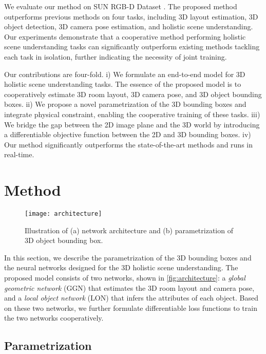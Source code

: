 \documentclass{article}
\begin{document}
We evaluate our method on SUN RGB-D Dataset \citep{song2015sun}. The proposed method outperforms previous methods on four tasks, including 3D layout estimation, 3D object detection, 3D camera pose estimation, and holistic scene understanding. Our experiments demonstrate that a cooperative method performing holistic scene understanding tasks can significantly outperform existing methods tackling each task in isolation, further indicating the necessity of joint training.

Our contributions are four-fold. i) We formulate an end-to-end model for 3D holistic scene understanding tasks. The essence of the proposed model is to cooperatively estimate 3D room layout, 3D camera pose, and 3D object bounding boxes. ii) We propose a novel parametrization of the 3D bounding boxes and integrate physical constraint, enabling the cooperative training of these tasks. iii) We bridge the gap between the 2D image plane and the 3D world by introducing a differentiable objective function between the 2D and 3D bounding boxes. iv) Our method significantly outperforms the state-of-the-art methods and runs in real-time.

\section{Method}
\label{sec:method}

\begin{figure}[t!]
    \begin{center}
        \texttt{[image: architecture]}
    \end{center}
    \caption{Illustration of (a) network architecture and (b) parametrization of 3D object bounding box.}
    \label{fig:architecture}
\end{figure}

In this section, we describe the parametrization of the 3D bounding boxes and the neural networks designed for the 3D holistic scene understanding. The proposed model consists of two networks, shown in \autoref{fig:architecture}: a \emph{global geometric network} (GGN) that estimates the 3D room layout and camera pose, and a \emph{local object network} (LON) that infers the attributes of each object. Based on these two networks, we further formulate differentiable loss functions to train the two networks cooperatively.

\subsection{Parametrization}
\label{sec:param}
\end{document}
